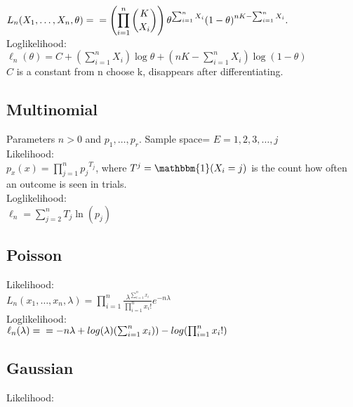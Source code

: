 $\displaystyle  L_ n(X_1, \ldots , X_ n, \theta ) =\\
= \left( \prod _{i = 1}^ n \binom {K}{X_ i} \right) \theta ^{\sum _{i = 1}^ n X_ i} (1 - \theta )^{nK - \sum _{i = 1}^ n X_ i }.$\\

Loglikelihood:\\

$\ell_n (\theta) = C + \left( \sum _{i = 1}^ n X_ i \right) \log \theta + \left( nK - \sum _{i = 1}^ n X_ i \right) \log (1 - \theta )$\\
 
$C$ is a constant from n choose k, disappears after differentiating.


\subsection*{Multinomial}

Parameters $n>0$ and $p_1, \ldots, p_r$. Sample space= $E={1,2,3,\ldots,j}$\\

Likelihood:\\

$p_x(x)= \prod _{j=1}^{n}{p_{{j}}}^{T_{{j}}}$, where $T^j=\mathbbm{1}( X_i=j)$ is the count how often an outcome is seen in trials. \\

Loglikelihood:\\
$\ell_n= \sum _{j=2}^{n}T_{{j}}\ln  \left( p_{{j}} \right)$\\

\subsection*{Poisson}
Likelihood:\\
$L_ n(x_1, \ldots , x_ n, \lambda) = \prod _{i = 1}^ n \frac{\lambda^{\sum_{i=1}^{n} x_i}}{\prod _{i = 1}^ n x_i!} e^{-n\lambda}$\\

Loglikelihood:\\
$\ell_n (\lambda)= \\
= -n\lambda + log(\lambda)(\sum_{i=1}^n x_i)) - log(\prod _{i = 1}^ n x_i!)$


\subsection*{Gaussian}

Likelihood:\\

